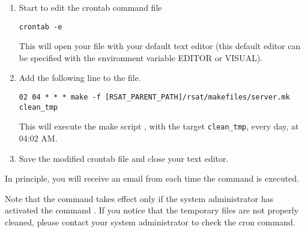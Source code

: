 \documentclass[12pt,a4paper, twoside]{scrreprt} %
\begin{document}
\begin{enumerate}
\item Start to edit the crontab command file

\begin{lstlisting}
crontab -e
\end{lstlisting}

This will open your  file with your default text editor
(this default editor can be specified with the environment variable
EDITOR or VISUAL).

\item Add the following line to the  file. 

\begin{lstlisting}
02 04 * * * make -f [RSAT_PARENT_PATH]/rsat/makefiles/server.mk clean_tmp
\end{lstlisting}

This will execute the make script , with the target
\texttt{clean\_tmp}, every day, at 04:02 AM. 

\item Save the modified crontab file and close your text editor.

\end{enumerate}

In principle, you will receive an email from  each
time the command is executed.

Note that the command  takes effect only if the
system administrator has activated the command . If you
notice that the temporary files are not properly cleaned, please
contact your system administrator to check the cron command.
\end{document}
